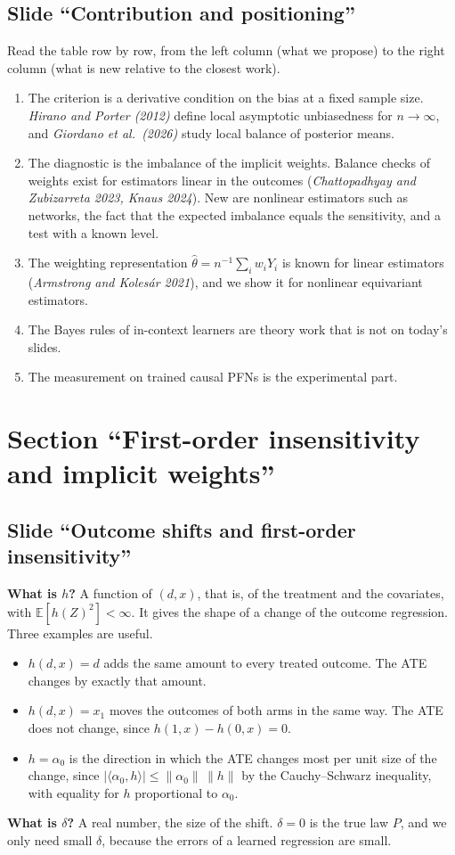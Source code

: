 \documentclass[10pt]{article}
\newcommand{\E}{\mathbb{E}}
\newcommand{\slide}[1]{\subsection*{Slide ``#1''}}
\begin{document}
\slide{Contribution and positioning}
Read the table row by row, from the left column (what we propose) to the right column (what is new relative to the
closest work).
\begin{enumerate}
\item The criterion is a derivative condition on the bias at a fixed sample size. \textit{Hirano and Porter (2012)}
define local asymptotic unbiasedness for $n\to\infty$, and \textit{Giordano et al.\ (2026)} study local balance of
posterior means.
\item The diagnostic is the imbalance of the implicit weights. Balance checks of weights exist for estimators linear in
the outcomes (\textit{Chattopadhyay and Zubizarreta 2023, Knaus 2024}). New are nonlinear estimators such as networks,
the fact that the expected imbalance equals the sensitivity, and a test with a known level.
\item The weighting representation $\hat\theta=n^{-1}\sum_iw_iY_i$ is known for linear estimators (\textit{Armstrong
and Koles\'ar 2021}), and we show it for nonlinear equivariant estimators.
\item The Bayes rules of in-context learners are theory work that is not on today's slides.
\item The measurement on trained causal PFNs is the experimental part.
\end{enumerate}

\section*{Section ``First-order insensitivity and implicit weights''}

\slide{Outcome shifts and first-order insensitivity}
\textbf{What is $h$?} A function of $(d,x)$, that is, of the treatment and the covariates, with $\E[h(Z)^2]<\infty$. It
gives the shape of a change of the outcome regression. Three examples are useful.
\begin{itemize}
\item $h(d,x)=d$ adds the same amount to every treated outcome. The ATE changes by exactly that amount.
\item $h(d,x)=x_1$ moves the outcomes of both arms in the same way. The ATE does not change, since
$h(1,x)-h(0,x)=0$.
\item $h=\alpha_0$ is the direction in which the ATE changes most per unit size of the change, since
$|\langle\alpha_0,h\rangle|\le\|\alpha_0\|\,\|h\|$ by the Cauchy--Schwarz inequality, with equality for $h$
proportional to $\alpha_0$.
\end{itemize}
\textbf{What is $\delta$?} A real number, the size of the shift. $\delta=0$ is the true law $P$, and we only need small
$\delta$, because the errors of a learned regression are small.
\end{document}
